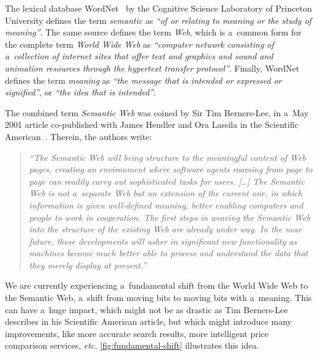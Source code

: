 The lexical database
WordNet~\cite{fellbaum1998wordnet,miller1995wordnet}
by the Cognitive Science Laboratory
of Princeton University defines the term \emph{semantic}
as \emph{``of or relating to meaning or the study of meaning''}.
The same source defines the term \emph{Web},
which is a~common form for the complete term
\emph{World Wide Web} as
\emph{``computer network consisting of a~collection of internet sites that offer text and graphics and
sound and animation resources through the hypertext
transfer protocol''}.
Finally, WordNet defines the term \emph{meaning}
as \emph{``the message that is intended or expressed
or signified''}, or \emph{``the idea that is intended''}.

The combined term \emph{Semantic Web} was coined
by Sir Tim Berners-Lee,
in a~May 2001 article co-published with James Hendler
and Ora Lassila
in the Scientific American~\cite{bernerslee2001semanticweb}.
Therein, the authors write:

\begin{quotation}
\textit{``The Semantic Web will bring structure to the meaningful
content of Web pages,
creating an environment where software agents
roaming from page to page
can readily carry out sophisticated tasks for users. [\ldots]
The Semantic Web is not a~separate Web
but an extension of the current one,
in which information is given well-defined meaning,
better enabling computers and people
to work in cooperation.
The first steps in weaving the Semantic Web
into the structure of the existing Web
are already under way.
In the near future, these developments
will usher in significant new functionality
as machines become much better able to process and \emph{understand} the data
that they merely display at present.''}
\end{quotation}

We are currently experiencing a~fundamental shift
from the World Wide Web to the Semantic Web,
a~shift from moving bits to moving bits with a~meaning.
This can have a~huge impact,
which might not be as drastic as Tim Berners-Lee describes
in his Scientific American article,
but which might introduce many improvements,
like more accurate search results,
more intelligent price comparison services, \emph{etc.}
\autoref{fig:fundamental-shift} illustrates this idea.

